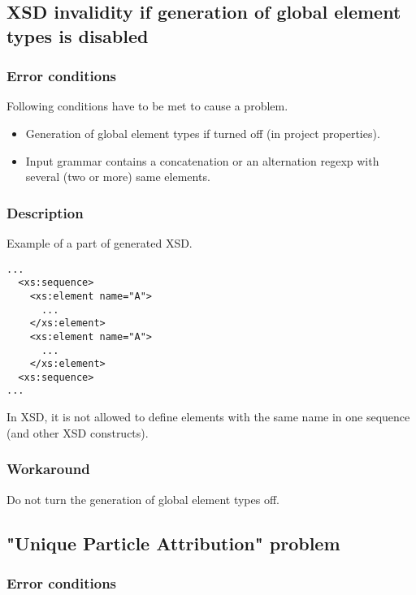 \documentclass[a4paper,10pt,oneside]{article}
\begin{document}
\subsection{XSD invalidity if generation of global element types is disabled}

\subsubsection{Error conditions}

Following conditions have to be met to cause a problem.

\begin{itemize}
	\item Generation of global element types if turned off (in project properties).
	\item Input grammar contains a concatenation or an alternation regexp with several (two or more) same elements.
\end{itemize}

\subsubsection{Description}

Example of a part of generated XSD.

\begin{verbatim}
...
  <xs:sequence>
    <xs:element name="A">
      ...
    </xs:element>
    <xs:element name="A">
      ...
    </xs:element>
  <xs:sequence>
...
\end{verbatim}

In XSD, it is not allowed to define elements with the same name in one sequence (and other XSD constructs).

\subsubsection{Workaround}

Do not turn the generation of global element types off.

\subsection{"Unique Particle Attribution" problem}

\subsubsection{Error conditions}
\end{document}

